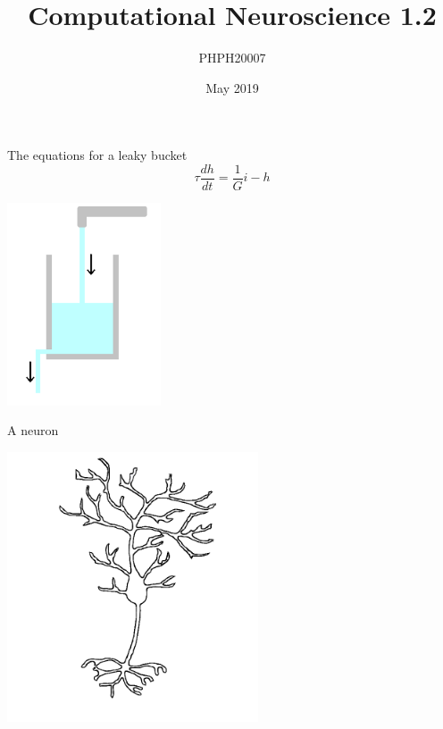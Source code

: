 \documentclass{beamer}
\title[Computational Neuroscience 1.2]{Computational Neuroscience 1.2}
\author{PHPH20007}
\institute{\texttt{github.com/conorhoughton/PHPH20007}}
\date{May 2019}
\newcommand{\crish}{\color{reddish}}
\newcommand{\cbla}{\color{black}}
\begin{document}
\maketitle

\begin{frame}{The equations for a leaky bucket}
  \crish
  $$\tau\frac{dh}{dt}=\frac{1}{G}i-h$$\cbla
  
  \begin{center}
    \includegraphics[height=6cm]{glass.png}
  \end{center}
\end{frame}


\begin{frame}{A neuron}
  \begin{center}
    \includegraphics[height=8cm]{neuron.png}
  \end{center}
\end{frame}
\end{document}
